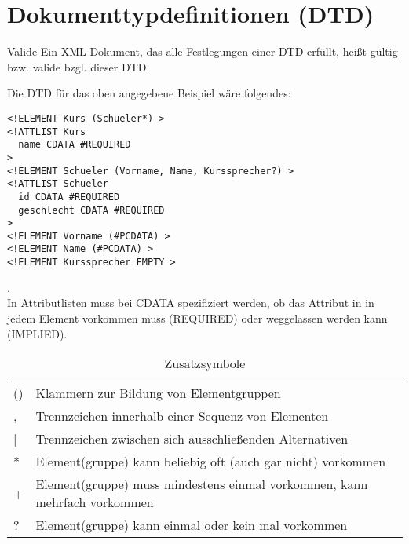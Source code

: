 \section{Dokumenttypdefinitionen (DTD)}
\begin{zitat}{Valide}
Ein XML-Dokument, das alle Festlegungen einer DTD erfüllt, heißt gültig bzw. valide bzgl. dieser DTD.
\end{zitat}
Die DTD für das oben angegebene Beispiel wäre folgendes:
\begin{lstlisting}
<!ELEMENT Kurs (Schueler*) >
<!ATTLIST Kurs
  name CDATA #REQUIRED
>
<!ELEMENT Schueler (Vorname, Name, Kurssprecher?) >
<!ATTLIST Schueler
  id CDATA #REQUIRED
  geschlecht CDATA #REQUIRED
>
<!ELEMENT Vorname (#PCDATA) >
<!ELEMENT Name (#PCDATA) >
<!ELEMENT Kurssprecher EMPTY >
\end{lstlisting}
.\\
In Attributlisten muss bei CDATA spezifiziert werden, ob das Attribut in in jedem Element vorkommen muss (REQUIRED) oder weggelassen werden kann (IMPLIED).
\begin{table}[h]
\caption{Zusatzsymbole}
\begin{tabular}{ll}
() & Klammern zur Bildung von Elementgruppen                                   \\
,  & Trennzeichen innerhalb einer Sequenz von Elementen                        \\
|  & Trennzeichen zwischen sich ausschließenden Alternativen                   \\
*  & Element(gruppe) kann beliebig oft (auch gar nicht) vorkommen              \\
+  & Element(gruppe) muss mindestens einmal vorkommen, kann mehrfach vorkommen \\
?  & Element(gruppe) kann einmal oder kein mal vorkommen
\end{tabular}
\end{table}
